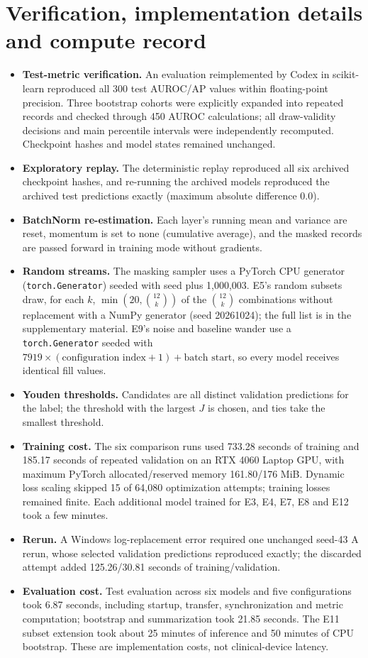 \clearpage
\section{Verification, implementation details and compute record}
\label{app:compute}

\begin{itemize}
\item \textbf{Test-metric verification.} An evaluation reimplemented by Codex in scikit-learn reproduced all 300 test AUROC/AP values within floating-point precision. Three bootstrap cohorts were explicitly expanded into repeated records and checked through 450 AUROC calculations; all draw-validity decisions and main percentile intervals were independently recomputed. Checkpoint hashes and model states remained unchanged.
\item \textbf{Exploratory replay.} The deterministic replay reproduced all six archived checkpoint hashes, and re-running the archived models reproduced the archived test predictions exactly (maximum absolute difference 0.0).
\item \textbf{BatchNorm re-estimation.} Each layer's running mean and variance are reset, momentum is set to none (cumulative average), and the masked records are passed forward in training mode without gradients.
\item \textbf{Random streams.} The masking sampler uses a PyTorch CPU generator (\texttt{torch.Generator}) seeded with seed plus 1,000,003. E5's random subsets draw, for each $k$, $\min(20, \binom{12}{k})$ of the $\binom{12}{k}$ combinations without replacement with a NumPy generator (seed 20261024); the full list is in the supplementary material. E9's noise and baseline wander use a \texttt{torch.Generator} seeded with $7919\times(\text{configuration index}+1)+\text{batch start}$, so every model receives identical fill values.
\item \textbf{Youden thresholds.} Candidates are all distinct validation predictions for the label; the threshold with the largest $J$ is chosen, and ties take the smallest threshold.
\item \textbf{Training cost.} The six comparison runs used 733.28 seconds of training and 185.17 seconds of repeated validation on an RTX 4060 Laptop GPU, with maximum PyTorch allocated/reserved memory 161.80/176 MiB. Dynamic loss scaling skipped 15 of 64,080 optimization attempts; training losses remained finite. Each additional model trained for E3, E4, E7, E8 and E12 took a few minutes.
\item \textbf{Rerun.} A Windows log-replacement error required one unchanged seed-43 A rerun, whose selected validation predictions reproduced exactly; the discarded attempt added 125.26/30.81 seconds of training/validation.
\item \textbf{Evaluation cost.} Test evaluation across six models and five configurations took 6.87 seconds, including startup, transfer, synchronization and metric computation; bootstrap and summarization took 21.85 seconds. The E11 subset extension took about 25 minutes of inference and 50 minutes of CPU bootstrap. These are implementation costs, not clinical-device latency.
\end{itemize}
